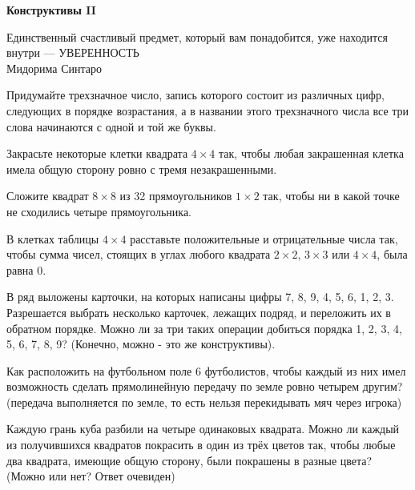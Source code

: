 \centerline{\bf \Huge Конструктивы II}


\begin{flushright}
        \scriptsize{Единственный счастливый предмет, который вам понадобится, уже находится внутри — УВЕРЕННОСТЬ\\ Мидорима Синтаро}
\end{flushright}

 Придумайте трехзначное число, запись которого состоит из различных цифр, следующих в порядке возрастания, а в названии этого трехзначного числа все три слова начинаются с одной и той же буквы.

 Закрасьте некоторые клетки квадрата $4\times4$ так, чтобы любая закрашенная клетка имела общую сторону ровно с тремя незакрашенными.

 Сложите квадрат $8\times8$ из 32 прямоугольников $1\times2$  так, чтобы ни в какой точке не сходились четыре прямоугольника.

 В клетках таблицы $4\times4$ расставьте положительные и отрицательные числа так, чтобы сумма чисел, стоящих в углах любого квадрата $2\times2$, $3\times3$ или $4\times4$, была равна 0.

 В ряд выложены карточки, на которых написаны цифры 7, 8, 9, 4, 5, 6, 1, 2, 3. Разрешается выбрать несколько карточек, лежащих подряд, и переложить их в обратном порядке. Можно ли за три таких операции добиться порядка 1, 2, 3, 4, 5, 6, 7, 8, 9? (Конечно, можно - это же конструктивы).


 Как расположить на футбольном поле 6 футболистов, чтобы каждый из них имел возможность сделать прямолинейную передачу по земле ровно четырем другим? (передача выполняется по земле, то есть нельзя перекидывать мяч через игрока)

 Каждую грань куба разбили на четыре одинаковых квадрата. Можно ли каждый из получившихся квадратов покрасить в один из трёх цветов так, чтобы любые два квадрата, имеющие общую сторону, были покрашены в разные цвета? (Можно или нет? Ответ очевиден)